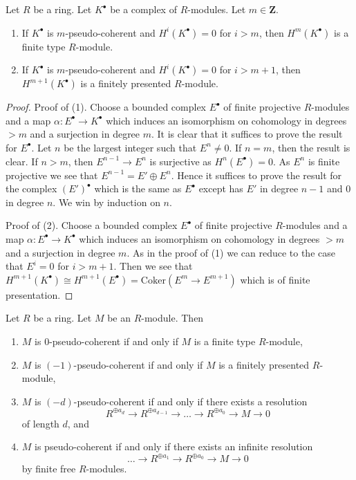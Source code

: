 \begin{lemma}
\label{lemma-finite-cohomology}
Let $R$ be a ring. Let $K^\bullet$ be a complex of $R$-modules.
Let $m \in \mathbf{Z}$.
\begin{enumerate}
\item If $K^\bullet$ is $m$-pseudo-coherent and $H^i(K^\bullet) = 0$
for $i > m$, then $H^m(K^\bullet)$ is a finite type $R$-module.
\item If $K^\bullet$ is $m$-pseudo-coherent and $H^i(K^\bullet) = 0$
for $i > m + 1$, then $H^{m + 1}(K^\bullet)$ is a finitely presented
$R$-module.
\end{enumerate}
\end{lemma}

\begin{proof}
Proof of (1). Choose a bounded complex $E^\bullet$ of finite projective
$R$-modules and a map $\alpha : E^\bullet \to K^\bullet$ which induces
an isomorphism on cohomology in degrees $> m$ and a surjection in degree $m$.
It is clear that it suffices to prove the result for $E^\bullet$.
Let $n$ be the largest integer such that $E^n \not = 0$.
If $n = m$, then the result is clear.
If $n > m$, then $E^{n - 1} \to E^n$ is surjective as
$H^n(E^\bullet) = 0$. As $E^n$ is finite projective we see that
$E^{n - 1} = E' \oplus E^n$. Hence it suffices to prove the result
for the complex $(E')^\bullet$ which is the same as $E^\bullet$
except has $E'$ in degree $n - 1$ and $0$ in degree $n$.
We win by induction on $n$.

\medskip\noindent
Proof of (2). Choose a bounded complex $E^\bullet$ of finite projective
$R$-modules and a map $\alpha : E^\bullet \to K^\bullet$ which induces
an isomorphism on cohomology in degrees $> m$ and a surjection in degree $m$.
As in the proof of (1) we can reduce to the case that $E^i = 0$ for
$i > m + 1$. Then we see that
$H^{m + 1}(K^\bullet) \cong
H^{m + 1}(E^\bullet) = \text{Coker}(E^m \to E^{m + 1})$
which is of finite presentation.
\end{proof}

\begin{lemma}
\label{lemma-n-pseudo-module}
Let $R$ be a ring. Let $M$ be an $R$-module.
Then
\begin{enumerate}
\item $M$ is $0$-pseudo-coherent if and only if $M$ is a finite type
$R$-module,
\item $M$ is $(-1)$-pseudo-coherent if and only if $M$ is a finitely
presented $R$-module,
\item $M$ is $(-d)$-pseudo-coherent if and only if there exists a
resolution
$$
R^{\oplus a_d} \to R^{\oplus a_{d - 1}} \to \ldots \to R^{\oplus a_0} \to
M \to 0
$$
of length $d$, and
\item $M$ is pseudo-coherent if and only if there exists an
infinite resolution
$$
\ldots \to R^{\oplus a_1} \to R^{\oplus a_0} \to M \to 0
$$
by finite free $R$-modules.
\end{enumerate}
\end{lemma}

